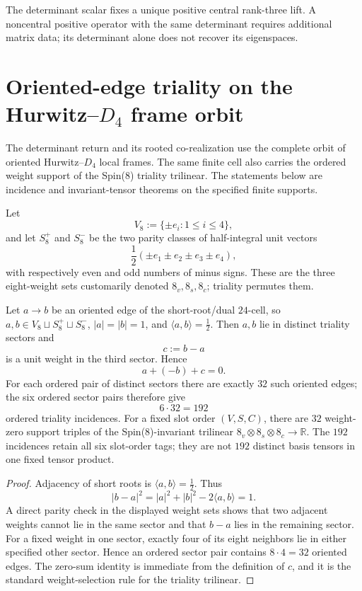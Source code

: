 \documentclass[11pt]{article}
\begin{document}
\begin{remark}
\label{p1:rem:v560-cross-role-boundary}
The determinant scalar fixes a unique positive central rank-three lift.
A noncentral positive operator with the same determinant requires additional
matrix data; its determinant alone does not recover its eigenspaces.
\end{remark}


\section{Oriented-edge triality on the Hurwitz--\texorpdfstring{\(D_4\)}{D4} frame orbit}
\label{p1:sec:v561-d4-triality-incidence-parent}

The determinant return and its rooted co-realization use the complete orbit of oriented
Hurwitz--\(D_4\) local frames.  The same finite cell also carries the ordered
weight support of the Spin(8) triality trilinear.  The statements below are
incidence and invariant-tensor theorems on the specified finite supports.

Let
\[
 V_8:=\{\pm e_i:1\le i\le4\},
\]
and let \(S_8^+\) and \(S_8^-\) be the two parity classes of half-integral unit
vectors
\[
 \frac12(\pm e_1\pm e_2\pm e_3\pm e_4),
\]
with respectively even and odd numbers of minus signs.  These are the three
eight-weight sets customarily denoted \(8_v,8_s,8_c\); triality permutes them.

\begin{theorem}
\label{p1:thm:v561-oriented-edge-triality-support}
Let \(a\to b\) be an oriented edge of the short-root/dual \(24\)-cell, so
\(a,b\in V_8\sqcup S_8^+\sqcup S_8^-\), \(|a|=|b|=1\), and
\(\langle a,b\rangle=\tfrac12\).  Then \(a,b\) lie in distinct triality
sectors and
\[
 c:=b-a
\]
is a unit weight in the third sector.  Hence
\[
 \boxed{a+(-b)+c=0.}
\]
For each ordered pair of distinct sectors there are exactly \(32\) such
oriented edges; the six ordered sector pairs therefore give
\[
 \boxed{6\cdot32=192}
\]
ordered triality incidences. For a fixed slot order \((V,S,C)\), there
are \(32\) weight-zero support triples of the Spin(8)-invariant
trilinear \(8_v\otimes8_s\otimes8_c\to\mathbb R\). The \(192\)
incidences retain all six slot-order tags; they are not \(192\)
distinct basis tensors in one fixed tensor product.
\end{theorem}

\begin{proof}
Adjacency of short roots is \(\langle a,b\rangle=\tfrac12\).  Thus
\[
 |b-a|^2=|a|^2+|b|^2-2\langle a,b\rangle=1.
\]
A direct parity check in the displayed weight sets shows that two adjacent
weights cannot lie in the same sector and that \(b-a\) lies in the remaining
sector.  For a fixed weight in one sector, exactly four of its eight neighbors
lie in either specified other sector.  Hence an ordered sector pair contains
\(8\cdot4=32\) oriented edges.  The zero-sum identity is immediate from the
definition of \(c\), and it is the standard weight-selection rule for the
triality trilinear.
\end{proof}
\end{document}
